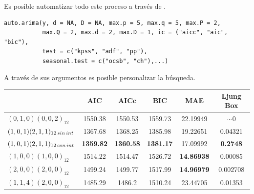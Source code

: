\documentclass[10pt,a4paper,twoside]{beamer}
\begin{document}
\begin{frame}[fragile]
Es posible automatizar todo este proceso a través de .
\begin{Verbatim}[fontsize=\footnotesize]
auto.arima(y, d = NA, D = NA, max.p = 5, max.q = 5, max.P = 2,
           max.Q = 2, max.d = 2, max.D = 1, ic = ("aicc", "aic", "bic"),
           test = c("kpss", "adf", "pp"),
           seasonal.test = c("ocsb", "ch"),...)
\end{Verbatim}
A través de sus argumentos es posible personalizar la búsqueda.

\begin{table}[]
\centering
\label{my-label}
\begin{adjustbox}{max width=\textwidth}
\begin{tabular}{|l|c|c|c|c|c|}
\hline
\multicolumn{1}{|c|}{}                & AIC              & AICc             & BIC & MAE & Ljung Box \\ \hline
$(0,1,0)(0,0,2)_{12}$               & 1550.38          & 1550.53          & 1559.73                  & 22.19949                 & $\sim 0$                                   \\ \hline
$(1,0,1)(2,1,1)_{12 \thinspace sin \thinspace int}$ & 1367.68          & 1368.25          & 1385.98                  & 19.22651                 & 0.04321                                  \\ \hline
$(1,0,1)(2,1,1)_{12 \thinspace con \thinspace int}$ & \textbf{1359.82} & \textbf{1360.58} & \textbf{1381.17}         & 17.09992                 & \textbf{0.2748}                          \\ \hline
$(1,0,0)(1,0,0)_{12}$               & 1514.22          & 1514.47          & 1526.72                  & \textbf{14.86938}        & 0.00085                                   \\ \hline
$(2,0,0)(2,0,0)_{12}$                & 1499.24          & 1499.77          & 1517.99                  & \textbf{14.96979}        & 0.002708                                  \\ \hline
$(1,1,4)(2,0,0)_{12}$               & 1485.29          & 1486.2           & 1510.24                  & 23.44705                 & 0.01353                                  \\ \hline
\end{tabular}
\end{adjustbox}
\end{table}

\end{frame}
\end{document}
